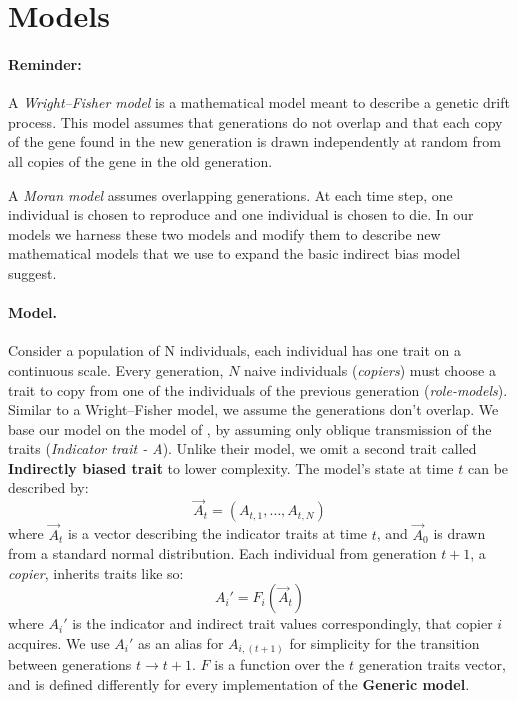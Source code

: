 \documentclass[11pt]{article}
\begin{document}
\section{Models}
\paragraph{Reminder:} A \textit{Wright–Fisher model} is a mathematical model meant to describe a genetic drift process. This model assumes that generations do not overlap and that each copy of the gene found in the new generation is drawn independently at random from all copies of the gene in the old generation.

A \textit{Moran model} assumes overlapping generations. At each time step, one individual is chosen to reproduce and one individual is chosen to die. In our models we harness these two models and modify them to describe new mathematical models that we use to expand the basic indirect bias model \citet{evolutionBook} suggest.

\paragraph{Model.} Consider a population of N individuals, each individual has one trait on a continuous scale. Every generation, $N$ naive individuals (\textit{copiers}) must choose a trait to copy from one of the individuals of the previous generation (\textit{role-models}). Similar to a Wright–Fisher model, we assume the generations don’t overlap. We base our model on the model of \citet{evolutionBook}, by assuming only oblique transmission of the traits (\textit{Indicator trait - A}). Unlike their model, we omit a second trait called \textbf{Indirectly biased trait} to lower complexity. The model’s state at time $t$ can be described by:
\begin{equation}
\vec{A}_t=(A_{t,1}, \ldots, A_{t,N})
\end{equation}
where $\vec{A}_t$ is a vector describing the indicator traits at time $t$, and $\vec{A}_0$ is drawn from a standard normal distribution.
Each individual from generation $t+1$, a \textit{copier}, inherits traits like so:
\begin{equation}
A_i' = F_i(\vec{A}_t)
\end{equation}
where $A_i'$ is the indicator and indirect trait values correspondingly, that copier $i$ acquires.
We use $A_i'$ as an alias for $A_{i,(t+1)}$ for simplicity for the transition between generations $t \rightarrow t+1$.
$F$ is a function over the $t$ generation traits vector, and is defined differently for every implementation of the \textbf{Generic model}.
\end{document}
